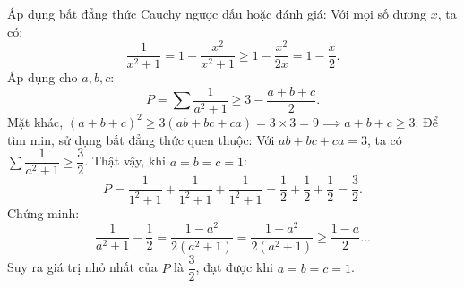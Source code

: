 \begin{loi_giai_cau}
Áp dụng bất đẳng thức Cauchy ngược dấu hoặc đánh giá:
Với mọi số dương $x$, ta có:
\[\frac{1}{x^2+1} = 1 - \frac{x^2}{x^2+1} \ge 1 - \frac{x^2}{2x} = 1 - \frac{x}{2}.\]
Áp dụng cho $a, b, c$:
\[P = \sum \frac{1}{a^2+1} \ge 3 - \frac{a+b+c}{2}.\]
Mặt khác, $(a+b+c)^2 \ge 3(ab+bc+ca) = 3 \times 3 = 9 \implies a+b+c \ge 3$.
Để tìm min, sử dụng bất đẳng thức quen thuộc:
Với $ab+bc+ca = 3$, ta có $\sum \dfrac{1}{a^2+1} \ge \dfrac{3}{2}$.
Thật vậy, khi $a = b = c = 1$:
\[P = \frac{1}{1^2+1} + \frac{1}{1^2+1} + \frac{1}{1^2+1} = \frac{1}{2} + \frac{1}{2} + \frac{1}{2} = \frac{3}{2}.\]
Chứng minh:
\[\frac{1}{a^2+1} - \frac{1}{2} = \frac{1-a^2}{2(a^2+1)} = \frac{1-a^2}{2(a^2+1)} \ge \frac{1-a}{2} \dots\]
Suy ra giá trị nhỏ nhất của $P$ là $\boxed{\dfrac{3}{2}}$, đạt được khi $a = b = c = 1$.
\end{loi_giai_cau}
